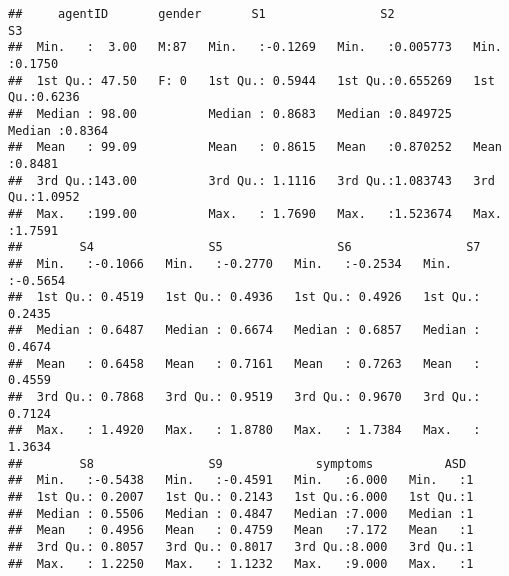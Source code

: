 \documentclass[]{article}
\newenvironment{Shaded}{\begin{snugshade}}{\end{snugshade}}
\newcommand{\KeywordTok}[1]{\textcolor[rgb]{0.13,0.29,0.53}{\textbf{#1}}}
\newcommand{\DecValTok}[1]{\textcolor[rgb]{0.00,0.00,0.81}{#1}}
\newcommand{\StringTok}[1]{\textcolor[rgb]{0.31,0.60,0.02}{#1}}
\newcommand{\CommentTok}[1]{\textcolor[rgb]{0.56,0.35,0.01}{\textit{#1}}}
\newcommand{\OperatorTok}[1]{\textcolor[rgb]{0.81,0.36,0.00}{\textbf{#1}}}
\newcommand{\NormalTok}[1]{#1}
\begin{document}
\begin{verbatim}
##     agentID       gender       S1                S2                 S3        
##  Min.   :  3.00   M:87   Min.   :-0.1269   Min.   :0.005773   Min.   :0.1750  
##  1st Qu.: 47.50   F: 0   1st Qu.: 0.5944   1st Qu.:0.655269   1st Qu.:0.6236  
##  Median : 98.00          Median : 0.8683   Median :0.849725   Median :0.8364  
##  Mean   : 99.09          Mean   : 0.8615   Mean   :0.870252   Mean   :0.8481  
##  3rd Qu.:143.00          3rd Qu.: 1.1116   3rd Qu.:1.083743   3rd Qu.:1.0952  
##  Max.   :199.00          Max.   : 1.7690   Max.   :1.523674   Max.   :1.7591  
##        S4                S5                S6                S7         
##  Min.   :-0.1066   Min.   :-0.2770   Min.   :-0.2534   Min.   :-0.5654  
##  1st Qu.: 0.4519   1st Qu.: 0.4936   1st Qu.: 0.4926   1st Qu.: 0.2435  
##  Median : 0.6487   Median : 0.6674   Median : 0.6857   Median : 0.4674  
##  Mean   : 0.6458   Mean   : 0.7161   Mean   : 0.7263   Mean   : 0.4559  
##  3rd Qu.: 0.7868   3rd Qu.: 0.9519   3rd Qu.: 0.9670   3rd Qu.: 0.7124  
##  Max.   : 1.4920   Max.   : 1.8780   Max.   : 1.7384   Max.   : 1.3634  
##        S8                S9             symptoms          ASD   
##  Min.   :-0.5438   Min.   :-0.4591   Min.   :6.000   Min.   :1  
##  1st Qu.: 0.2007   1st Qu.: 0.2143   1st Qu.:6.000   1st Qu.:1  
##  Median : 0.5506   Median : 0.4847   Median :7.000   Median :1  
##  Mean   : 0.4956   Mean   : 0.4759   Mean   :7.172   Mean   :1  
##  3rd Qu.: 0.8057   3rd Qu.: 0.8017   3rd Qu.:8.000   3rd Qu.:1  
##  Max.   : 1.2250   Max.   : 1.1232   Max.   :9.000   Max.   :1
\end{verbatim}

\begin{Shaded}
\end{Shaded}
\end{document}

